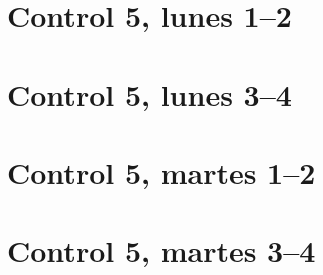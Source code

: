 \documentclass[12pt,spanish,a5paper,landscape]{article}
\begin{document}
  \pagestyle{empty}
  \thispagestyle{empty}

  \part*{Control 5, lunes 1--2}
  \newpage

  \newpage

  \part*{Control 5, lunes 3--4}
  \newpage

  \newpage

  \part*{Control 5, martes 1--2}
  \newpage

  \newpage

  \part*{Control 5, martes 3--4}
  \newpage
\end{document}
